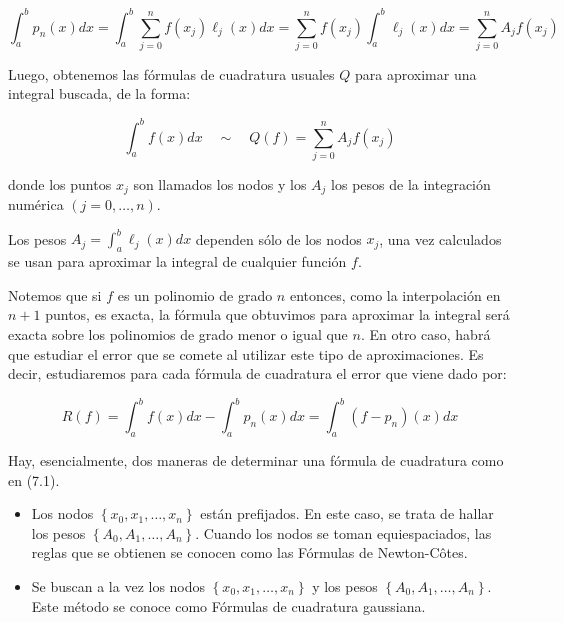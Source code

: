 \documentclass[10pt]{book}
\begin{document}
$$
\int_{a}^{b} p_{n}(x) d x=\int_{a}^{b} \sum_{j=0}^{n} f\left(x_{j}\right) \ell_{j}(x) d x=\sum_{j=0}^{n} f\left(x_{j}\right) \int_{a}^{b} \ell_{j}(x) d x=\sum_{j=0}^{n} A_{j} f\left(x_{j}\right)
$$

Luego, obtenemos las fórmulas de cuadratura usuales $Q$ para aproximar una integral buscada, de la forma:


\begin{equation*}
\int_{a}^{b} f(x) d x \quad \sim \quad Q(f)=\sum_{j=0}^{n} A_{j} f\left(x_{j}\right) \tag{7.1}
\end{equation*}


donde los puntos $x_{j}$ son llamados los nodos y los $A_{j}$ los pesos de la integración numérica $(j=0, \ldots, n)$.

Los pesos $A_{j}=\int_{a}^{b} \ell_{j}(x) d x$ dependen sólo de los nodos $x_{j}$, una vez calculados se usan para aproximar la integral de cualquier función $f$.

Notemos que si $f$ es un polinomio de grado $n$ entonces, como la interpolación en $n+1$ puntos, es exacta, la fórmula que obtuvimos para aproximar la integral será exacta sobre los polinomios de grado menor o igual que $n$. En otro caso, habrá que estudiar el error que se comete al utilizar este tipo de aproximaciones. Es decir, estudiaremos para cada fórmula de cuadratura el error que viene dado por:

$$
R(f)=\int_{a}^{b} f(x) d x-\int_{a}^{b} p_{n}(x) d x=\int_{a}^{b}\left(f-p_{n}\right)(x) d x
$$

Hay, esencialmente, dos maneras de determinar una fórmula de cuadratura como en (7.1).

\begin{itemize}
  \item Los nodos $\left\{x_{0}, x_{1}, \ldots, x_{n}\right\}$ están prefijados. En este caso, se trata de hallar los pesos $\left\{A_{0}, A_{1}, \ldots, A_{n}\right\}$. Cuando los nodos se toman equiespaciados, las reglas que se obtienen se conocen como las Fórmulas de Newton-Côtes.
  \item Se buscan a la vez los nodos $\left\{x_{0}, x_{1}, \ldots, x_{n}\right\}$ y los pesos $\left\{A_{0}, A_{1}, \ldots, A_{n}\right\}$. Este método se conoce como Fórmulas de cuadratura gaussiana.
\end{itemize}
\end{document}
